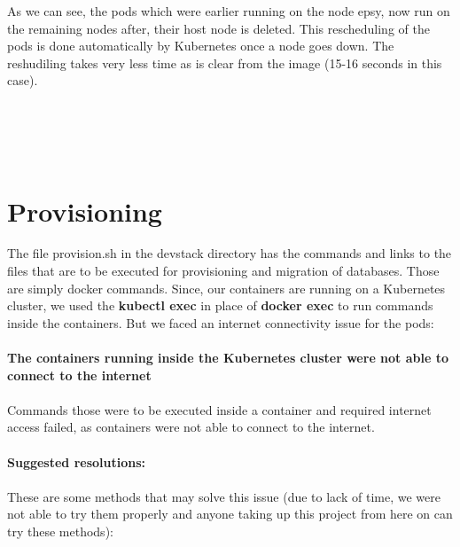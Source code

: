\documentclass[12pt]{report}
\begin{document}
As we can see, the pods which were earlier running on the node epsy, now run on the remaining nodes after, their host node is deleted. This rescheduling of the pods is done automatically by Kubernetes once a node goes down. The reshudiling takes very less time as is clear from the image (15-16 seconds in this case). 
\\\\\\\\\\
\section{Provisioning}
The file provision.sh in the devstack directory has the commands and links to the files that are to be executed for provisioning and migration of databases. Those are simply docker commands. Since, our containers are running on a Kubernetes cluster, we used the \textbf{kubectl exec} in place of \textbf{docker exec} to run commands inside the containers. But we faced an internet connectivity issue for the pods: \\\\
\textbf{The containers running inside the Kubernetes cluster were not able to connect to the internet}\\\\
Commands those were to be executed inside a container and required internet access failed, as containers were not able to connect to the internet.\\\\
\textbf{Suggested resolutions:\\\\}These are some methods that may solve this issue (due to lack of time, we were not able to try them properly and anyone taking up this project from here on can try these methods):
\end{document}
